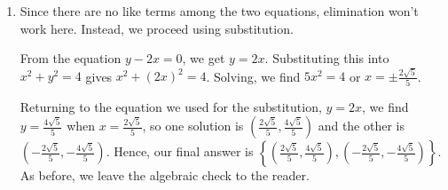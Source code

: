 \begin{ex}
\begin{enumerate}
\[\begin{array}{cc}
\begin{mfpic}[15]{-4}{4}{-3}{3}
\axes
\tlabel[cc](4,-0.5){\scriptsize $x$}
\tlabel[cc](0.5,3){\scriptsize $y$}
\xmarks{-3,-2,-1,1,2,3}
\ymarks{-2,-1,1,2}
\tlpointsep{4pt}
\axislabels {x}{{\scriptsize $-3 \hspace{17pt}$} -3, {\scriptsize $-2 \hspace{13pt}$} -2, {\scriptsize $-1 \hspace{7pt}$} -1, {\scriptsize $1$} 1, {\scriptsize $\hspace{7pt} 2$} 2, {\scriptsize $ \hspace{9pt} 3$} 3}
\axislabels {y}{{\scriptsize $-1$} -1, {\scriptsize $1$} 1}
\penwd{1.25pt}
\circle{(0,0),2}
\arrow \reverse \arrow \parafcn{-1.15,1.15,0.1}{(3*cosh(t),2*sinh(t))}
\arrow \reverse \arrow \parafcn{-1.15,1.15,0.1}{(-3*cosh(t),2*sinh(t))}
\end{mfpic}  \\

\text{Graphs for} \quad \left\{\begin{array}{rcr}  x^2 +y^2 & = & 4 \\ 4x^2+9y^2 & = & 36 \\ \end{array} \right.

&

\hspace{.75in}

\text{Graphs for} \quad \left\{\begin{array}{rcr}  x^2 +y^2 & = & 4 \\ 4x^2-9y^2 & = & 36 \\ \end{array} \right. \\

\end{array} \]

\item  Since there are no like terms among the two equations, elimination won't work here. Instead, we proceed using substitution.

From the equation $y - 2x =0$, we get $y=2x$. Substituting this into $x^2+y^2=4$ gives $x^2+(2x)^2 = 4$.  Solving, we find  $5x^2 = 4$ or $x = \pm \frac{2 \sqrt{5}}{5}$.  

Returning to the equation we used for the substitution, $y = 2x$, we find $y = \frac{4 \sqrt{5}}{5}$ when $x = \frac{2 \sqrt{5}}{5}$, so one solution is $\left( \frac{2 \sqrt{5}}{5} , \frac{4 \sqrt{5}}{5} \right)$ and the other is   $\left( -\frac{2 \sqrt{5}}{5} , -\frac{4 \sqrt{5}}{5} \right)$.  Hence, our final answer is  $\left\{\left( \frac{2 \sqrt{5}}{5} , \frac{4 \sqrt{5}}{5} \right),  \left( -\frac{2 \sqrt{5}}{5} , -\frac{4 \sqrt{5}}{5} \right) \right\}$.  As before, we leave the algebraic check to the reader. 


\end{enumerate}
\end{ex}

